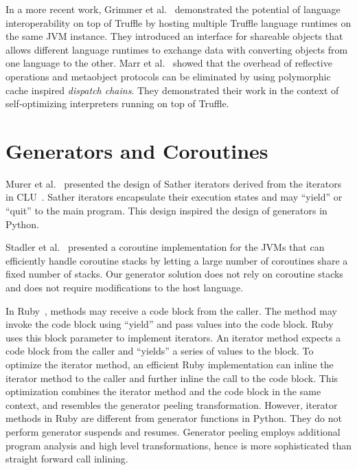 In a more recent work, Grimmer et al.~\cite{grimmer2015dynamically, Grimmer+2014interoperability} demonstrated the potential of language interoperability on top of Truffle by hosting multiple Truffle language runtimes on the same JVM instance.
They introduced an interface for shareable objects that allows different language runtimes to exchange data with converting objects from one language to the other.
Marr et al.~ showed that the overhead of reflective operations and metaobject protocols can be eliminated by using polymorphic cache inspired \emph{dispatch chains}.
They demonstrated their work in the context of self-optimizing interpreters running on top of Truffle.

\section{Generators and Coroutines}

Murer et al.~\cite{Murer1996} presented the design of Sather iterators derived from the iterators in CLU~\cite{Liskov1977}.
Sather iterators encapsulate their execution states and may ``yield'' or ``quit'' to the main program.
This design inspired the design of generators in Python.

Stadler et al.~\cite{Stadler2010} presented a coroutine implementation for the JVMs that can efficiently handle coroutine stacks by letting a large number of coroutines share a fixed number of stacks.
Our generator solution does not rely on coroutine stacks and does not require modifications to the host language.

In Ruby~\cite{ruby}, methods may receive a code block from the caller.
The method may invoke the code block using ``yield'' and pass values into the code block.
Ruby uses this block parameter to implement iterators.
An iterator method expects a code block from the caller and ``yields'' a series of values to the block.
To optimize the iterator method, an efficient Ruby implementation can inline the iterator method to the caller and further inline the call to the code block.
This optimization combines the iterator method and the code block in the same context, and resembles the generator peeling transformation.
However, iterator methods in Ruby are different from generator functions in Python.
They do not perform generator suspends and resumes.
Generator peeling employs additional program analysis and high level transformations, hence is more sophisticated than straight forward call inlining.

